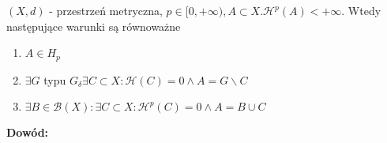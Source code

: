 \begin{tw}
	$(X,d)$ - przestrzeń metryczna, $p \in [0, +\infty), A \subset X. \mathcal{H}^p(A) < +\infty$. Wtedy następujące warunki są równoważne
	\begin{enumerate}
		\item $A \in H_p$
		\item $\exists G$ typu $G_{\delta} \exists C \subset X: \mathcal{H}(C)=0 \wedge A = G \backslash C$ 
		\item $\exists B \in \mathcal{B}(X): \exists C \subset X: \mathcal{H}^p(C) = 0 \wedge A = B \cup C$ 
	\end{enumerate}

	\textbf{Dowód:} \citep[3.52]{Tworzewski}
\end{tw}
